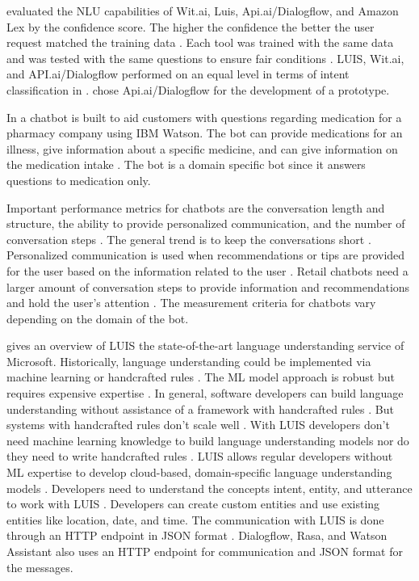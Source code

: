 \citet{gregori2017evaluation} evaluated the NLU capabilities of Wit.ai, Luis, Api.ai/Dialogflow, and Amazon Lex
by the confidence score. 
The higher the confidence the better the user request matched the training data \cite{gregori2017evaluation}.
Each tool was trained with the same data and was tested with the same questions to ensure fair conditions \cite{gregori2017evaluation}.
LUIS, Wit.ai, and API.ai/Dialogflow performed on an equal level in terms of intent classification in \citet{gregori2017evaluation}.
\citet{gregori2017evaluation} chose Api.ai/Dialogflow for the development of a prototype.

In \citet{pharmacybot} a chatbot is built to aid customers with questions regarding medication for a 
pharmacy company using IBM Watson.
The bot can provide medications for an illness, give information about a specific medicine, and can 
give information on the medication intake \cite{pharmacybot}.
The bot is a domain specific bot since it answers questions to medication only.

Important performance metrics for chatbots are the conversation length and structure, the ability to 
provide personalized communication, and the number of conversation steps \cite{PRZEGALINSKA2019785}.
The general trend is to keep the conversations short \cite{PRZEGALINSKA2019785}.
Personalized communication is used when recommendations or tips are provided for the user based on the 
information related to the user \cite{PRZEGALINSKA2019785}.
Retail chatbots need a larger amount of conversation steps to provide information and recommendations 
and hold the user's attention \cite{PRZEGALINSKA2019785}.
The measurement criteria for chatbots vary depending on the domain of the bot.

\citet{luis2015williams} gives an overview of LUIS the state-of-the-art language understanding service of Microsoft.
Historically, language understanding could be implemented via machine learning or handcrafted rules \cite{luis2015williams}.
The ML model approach is robust but requires expensive expertise \cite{luis2015williams}. 
In general, software developers can build language understanding without assistance of a framework
with handcrafted rules \cite{luis2015williams}. 
But systems with handcrafted rules don't scale well \cite{luis2015williams}.
With LUIS developers don't need machine learning knowledge to build language understanding models 
nor do they need to write handcrafted rules \cite{luis2015williams}.
LUIS allows regular developers without ML expertise to develop cloud-based, domain-specific language 
understanding models \cite{luis2015williams}.
Developers need to understand the concepts intent, entity, and utterance to work with LUIS \cite{luis2015williams}.
Developers can create custom entities and use existing entities like location, date, and time.
The communication with LUIS is done through an HTTP endpoint in JSON format \cite{luis2015williams}. 
Dialogflow, Rasa, and Watson Assistant also uses an HTTP endpoint for communication and JSON format for the messages. 


